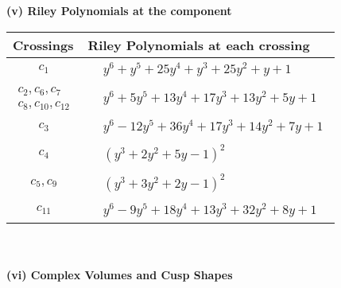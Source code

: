 \documentclass[1p]{elsarticle_modified}
\theoremstyle{definition}
\begin{document}
\newpage\renewcommand{\arraystretch}{1}
\flushleft \textbf{(v) Riley Polynomials at the component}\newline \\
\begin{tabular}{m{50pt}|m{274pt}}
Crossings & \hspace{64pt}Riley Polynomials at each crossing \\
\hline $$\begin{aligned}c_{1}\end{aligned}$$&$\begin{aligned}
&y^6+y^5+25 y^4+y^3+25 y^2+y+1
\end{aligned}$\\
\hline $$\begin{aligned}c_{2},c_{6},c_{7}\\c_{8},c_{10},c_{12}\end{aligned}$$&$\begin{aligned}
&y^6+5 y^5+13 y^4+17 y^3+13 y^2+5 y+1
\end{aligned}$\\
\hline $$\begin{aligned}c_{3}\end{aligned}$$&$\begin{aligned}
&y^6-12 y^5+36 y^4+17 y^3+14 y^2+7 y+1
\end{aligned}$\\
\hline $$\begin{aligned}c_{4}\end{aligned}$$&$\begin{aligned}
&(y^3+2 y^2+5 y-1)^2
\end{aligned}$\\
\hline $$\begin{aligned}c_{5},c_{9}\end{aligned}$$&$\begin{aligned}
&(y^3+3 y^2+2 y-1)^2
\end{aligned}$\\
\hline $$\begin{aligned}c_{11}\end{aligned}$$&$\begin{aligned}
&y^6-9 y^5+18 y^4+13 y^3+32 y^2+8 y+1
\end{aligned}$\\
\hline
\end{tabular}\\~\\
\newpage\flushleft \textbf{(vi) Complex Volumes and Cusp Shapes}
\end{document}
